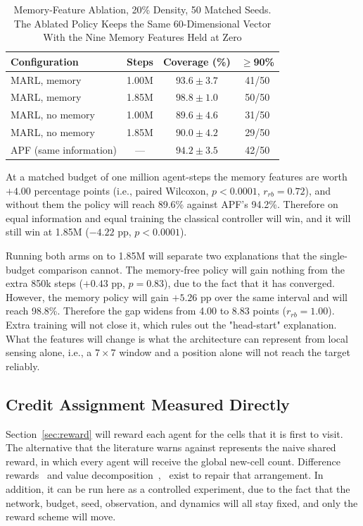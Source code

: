 \documentclass[a4paper, 10pt, conference]{ieeeconf}
\begin{document}
\begin{table}[htb]
\centering
\caption{Memory-Feature Ablation, 20\% Density, 50 Matched Seeds. The
Ablated Policy Keeps the Same 60-Dimensional Vector With the Nine
Memory Features Held at Zero}
\label{tab:ablation}
\scriptsize
\setlength{\tabcolsep}{3pt}
\begin{tabular}{lccc}
\toprule
\textbf{Configuration} & \textbf{Steps} & \textbf{Coverage (\%)} &
\textbf{$\geq$90\%} \\
\midrule
MARL, memory     & 1.00M & $93.6\pm3.7$ & 41/50 \\
MARL, memory     & 1.85M & $98.8\pm1.0$ & 50/50 \\
MARL, no memory  & 1.00M & $89.6\pm4.6$ & 31/50 \\
MARL, no memory  & 1.85M & $90.0\pm4.2$ & 29/50 \\
APF (same information) & --- & $94.2\pm3.5$ & 42/50 \\
\bottomrule
\end{tabular}
\end{table}

At a matched budget of one million agent-steps the memory features are
worth $+4.00$ percentage points (i.e., paired Wilcoxon, $p<0.0001$,
$r_{rb}=0.72$), and without them the policy will reach 89.6\% against
APF's 94.2\%. Therefore on equal information and equal training the
classical controller will win, and it will still win at 1.85M ($-4.22$
pp, $p<0.0001$).

Running both arms on to 1.85M will separate two explanations that the
single-budget comparison cannot. The memory-free policy will gain
nothing from the extra 850k steps ($+0.43$ pp, $p=0.83$), due to the
fact that it has converged. However, the memory policy will gain
$+5.26$ pp over the same interval and will reach 98.8\%. Therefore the
gap widens from 4.00 to 8.83 points ($r_{rb}=1.00$). Extra training
will not close it, which rules out the "head-start" explanation. What
the features will change is what the architecture can represent from
local sensing alone, i.e., a $7\times7$ window and a position alone
will not reach the target reliably.

\subsection{Credit Assignment Measured Directly}
\label{sec:credit}

Section~\ref{sec:reward} will reward each agent for the cells that it
is first to visit. The alternative that the literature warns against
represents the naive shared reward, in which every agent will receive
the global new-cell count. Difference rewards~\cite{foerster2018} and
value decomposition~\cite{sunehag2018},~\cite{rashid2018} exist to
repair that arrangement. In addition, it can be run here as a
controlled experiment, due to the fact that the network, budget, seed,
observation, and dynamics will all stay fixed, and only the reward
scheme will move.
\end{document}
